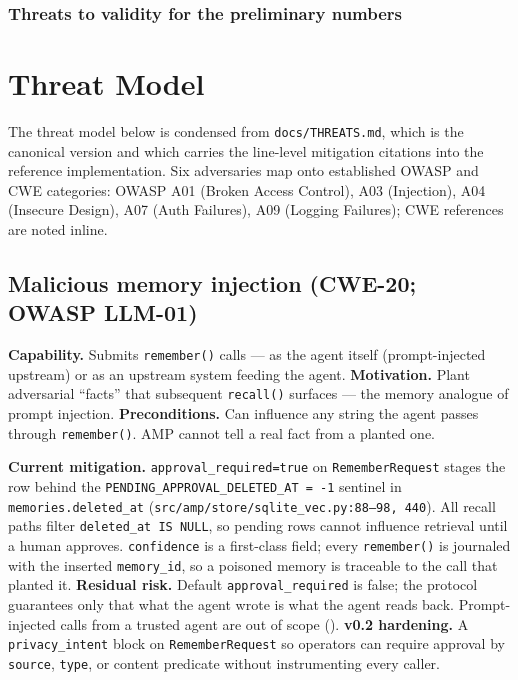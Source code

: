 \documentclass[11pt,letterpaper,twocolumn]{article}
\begin{document}
\subsubsection*{Threats to validity for the preliminary numbers}

\section{Threat Model}
\label{sec:threats}

The threat model below is condensed from \texttt{docs/THREATS.md}, which is the canonical version and which carries the line-level mitigation citations into the reference implementation. Six adversaries map onto established OWASP and CWE categories: OWASP A01 (Broken Access Control), A03 (Injection), A04 (Insecure Design), A07 (Auth Failures), A09 (Logging Failures); CWE references are noted inline.

\subsection{Malicious memory injection (CWE-20; OWASP LLM-01)}
\label{sec:threats-injection}

\textbf{Capability.} Submits \texttt{remember()} calls --- as the agent itself (prompt-injected upstream) or as an upstream system feeding the agent. \textbf{Motivation.} Plant adversarial ``facts'' that subsequent \texttt{recall()} surfaces --- the memory analogue of prompt injection. \textbf{Preconditions.} Can influence any string the agent passes through \texttt{remember()}. AMP cannot tell a real fact from a planted one.

\textbf{Current mitigation.} \texttt{approval\_required=true} on \texttt{RememberRequest} stages the row behind the \texttt{PENDING\_APPROVAL\_DELETED\_AT = -1} sentinel in \texttt{memories.deleted\_at} (\texttt{src/amp/store/sqlite\_vec.py:88--98, 440}). All recall paths filter \texttt{deleted\_at IS NULL}, so pending rows cannot influence retrieval until a human approves. \texttt{confidence} is a first-class field; every \texttt{remember()} is journaled with the inserted \texttt{memory\_id}, so a poisoned memory is traceable to the call that planted it. \textbf{Residual risk.} Default \texttt{approval\_required} is false; the protocol guarantees only that what the agent wrote is what the agent reads back. Prompt-injected calls from a trusted agent are out of scope (). \textbf{v0.2 hardening.} A \texttt{privacy\_intent} block on \texttt{RememberRequest} so operators can require approval by \texttt{source}, \texttt{type}, or content predicate without instrumenting every caller.
\end{document}

